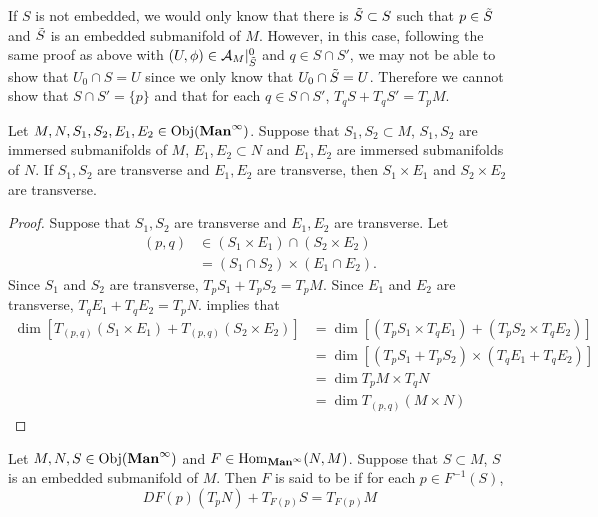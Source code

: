 \documentclass{book}
\begin{document}
	\begin{note}
		If $S$ is not embedded, we would only know that there is $\tilde{S} \subset S$ such that $p \in \tilde{S}$ and $\tilde{S}$ is an embedded submanifold of $M$. However, in this case, following the same proof as above with $(U, \phi) \in \mathcal{A}_M|^0_{\tilde{S}}$ and $q \in S \cap S'$, we may not be able to show that $U_0 \cap S = U$ since we only know that $U_0 \cap \tilde{S} = U$. Therefore we cannot show that $S \cap S' = \{p\}$ and that for each $q \in S \cap S'$, $T_q S + T_q S' = T_p M$. 
	\end{note}

	\begin{ex} 
		Let $M, N, S_1, S_2, E_1, E_2 \in \operatorname{Obj}(\operatorname*{\text{\textbf{Man}}^{\infty}})$. Suppose that $S_1, S_2 \subset M$, $S_1, S_2$ are immersed submanifolds of $M$, $E_1, E_2 \subset N$ and $E_1, E_2$ are immersed submanifolds of $N$. If $S_1, S_2$ are transverse and $E_1, E_2$ are transverse, then $S_1 \times E_1$ and $S_2 \times E_2$ are transverse.
	\end{ex}

	\begin{proof}
		Suppose that $S_1, S_2$ are transverse and $E_1, E_2$ are transverse. Let 
		\begin{align*}
			(p, q) 
			& \in (S_1 \times E_1) \cap (S_2 \times E_2) \\
			& = (S_1 \cap S_2) \times (E_1 \cap E_2).
		\end{align*}
		Since $S_1$ and $S_2$ are transverse, $T_pS_1 + T_p S_2 = T_p M$. Since $E_1$ and $E_2$ are transverse, $T_qE_1 + T_q E_2 = T_p N$.  implies that 
		\begin{align*}
			\dim [T_{(p,q)}(S_1 \times E_1) + T_{(p,q)}(S_2 \times E_2)]
			& = \dim [(T_pS_1 \times T_q E_1) + (T_pS_2 \times T_q E_2)] \\
			& = \dim [(T_pS_1 + T_pS_2) \times (T_q E_1 + T_q E_2)] \\
			& = \dim T_p M \times T_q N \\
			& = \dim T_{(p,q)} (M \times N)
		\end{align*}
	\end{proof}

	\begin{defn} 
		Let $M, N, S \in \operatorname{Obj}(\operatorname*{\text{\textbf{Man}}^{\infty}})$ and $F \in \operatorname{Hom}_{\operatorname*{\text{\textbf{Man}}^{\infty}}}(N, M)$. Suppose that $S \subset M$, $S$ is an embedded submanifold of $M$. Then $F$ is said to be  if for each $p \in F^{-1}(S)$, 
		$$DF(p)(T_pN) + T_{F(p)}S = T_{F(p)}M$$
	\end{defn}
\end{document}
